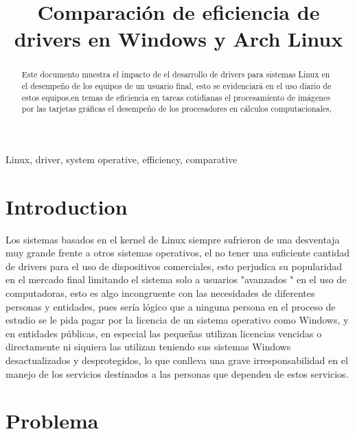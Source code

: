 \documentclass[conference]{IEEEtran}
\begin{document}
\title{Comparación de eficiencia de drivers en Windows y Arch Linux}
 
\author{
}

\maketitle

\begin{abstract}
Este documento muestra el impacto de el desarrollo de drivers para sistemas Linux en el desempeño de los equipos de un usuario final, esto se evidenciará en el uso diario de estos equipos,en temas de eficiencia en tareas cotidianas el procesamiento de imágenes por las tarjetas gráficas el desempeño de los procesadores en cálculos computacionales, 
\end{abstract}

\begin{IEEEkeywords}
Linux, driver, system operative, efficiency, comparative
\end{IEEEkeywords}

\section{Introduction}
Los sistemas basados en el kernel de Linux siempre sufrieron de una desventaja muy grande frente a otros sistemas operativos, el no tener una suficiente cantidad de drivers para el uso de dispositivos comerciales, esto perjudica su popularidad en el mercado final limitando el sistema solo a usuarios "avanzados " en el uso de computadoras, esto es algo incongruente con las necesidades de diferentes personas y entidades, pues sería lógico que a ninguna persona en el proceso de estudio se le pida pagar por la licencia de un sistema operativo como Windows, y en entidades públicas, en especial las pequeñas utilizan licencias vencidas o directamente ni siquiera las utilizan teniendo sus sistemas Windows desactualizados y desprotegidos, lo que conlleva una grave irresponsabilidad en el manejo de los servicios destinados a las personas que dependen de estos servicios.
\section{Problema}
\end{document}
